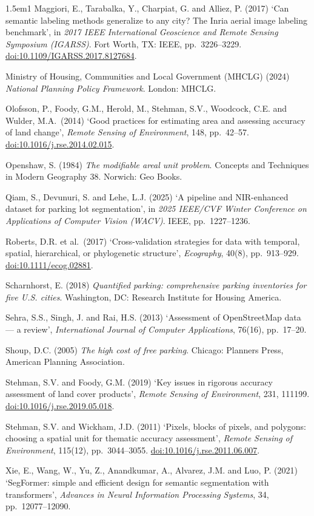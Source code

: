 \begin{hangparas}{1.5em}{1}
Maggiori, E., Tarabalka, Y., Charpiat, G. and Alliez, P. (2017) `Can semantic labeling methods generalize to any city? The Inria aerial image labeling benchmark', in \emph{2017 IEEE International Geoscience and Remote Sensing Symposium (IGARSS)}. Fort Worth, TX: IEEE, pp.~3226--3229. \url{doi:10.1109/IGARSS.2017.8127684}.

Ministry of Housing, Communities and Local Government (MHCLG) (2024) \emph{National Planning Policy Framework}. London: MHCLG.

Olofsson, P., Foody, G.M., Herold, M., Stehman, S.V., Woodcock, C.E. and Wulder, M.A.~(2014) `Good practices for estimating area and assessing accuracy of land change', \emph{Remote Sensing of Environment}, 148, pp.~42--57. \url{doi:10.1016/j.rse.2014.02.015}.

Openshaw, S. (1984) \emph{The modifiable areal unit problem}. Concepts and Techniques in Modern Geography 38. Norwich: Geo Books.

Qiam, S., Devunuri, S. and Lehe, L.J. (2025) `A pipeline and NIR-enhanced dataset for parking lot segmentation', in \emph{2025 IEEE/CVF Winter Conference on Applications of Computer Vision (WACV)}. IEEE, pp.~1227--1236.

Roberts, D.R. et al.~(2017) `Cross-validation strategies for data with temporal, spatial, hierarchical, or phylogenetic structure', \emph{Ecography}, 40(8), pp.~913--929. \url{doi:10.1111/ecog.02881}.

Scharnhorst, E. (2018) \emph{Quantified parking: comprehensive parking inventories for five U.S. cities}. Washington, DC: Research Institute for Housing America.

Sehra, S.S., Singh, J. and Rai, H.S. (2013) `Assessment of OpenStreetMap data --- a review', \emph{International Journal of Computer Applications}, 76(16), pp.~17--20.

Shoup, D.C. (2005) \emph{The high cost of free parking}. Chicago: Planners Press, American Planning Association.

Stehman, S.V. and Foody, G.M. (2019) `Key issues in rigorous accuracy assessment of land cover products', \emph{Remote Sensing of Environment}, 231, 111199. \url{doi:10.1016/j.rse.2019.05.018}.

Stehman, S.V. and Wickham, J.D. (2011) `Pixels, blocks of pixels, and polygons: choosing a spatial unit for thematic accuracy assessment', \emph{Remote Sensing of Environment}, 115(12), pp.~3044--3055. \url{doi:10.1016/j.rse.2011.06.007}.

Xie, E., Wang, W., Yu, Z., Anandkumar, A., Alvarez, J.M. and Luo, P. (2021) `SegFormer: simple and efficient design for semantic segmentation with transformers', \emph{Advances in Neural Information Processing Systems}, 34, pp.~12077--12090.


\end{hangparas}
